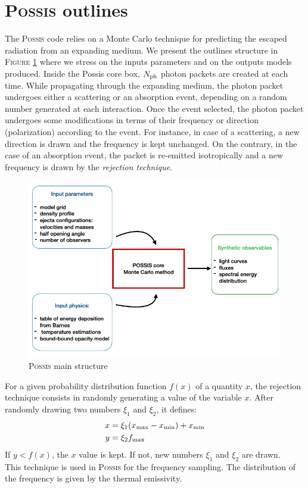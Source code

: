 \documentclass[a4paper, twoside, 11pt]{article}
\numberwithin{equation}{section}
\begin{document}
\section{P\textsc{ossis} outlines}
\label{appendix:possis}
\hspace{\parindent} The P\textsc{ossis} code relies on a Monte Carlo technique for predicting the escaped radiation from an expanding medium. We present the outlines structure in F\textsc{igure} \ref{fig:structurePossis} where we stress on the inputs parameters and on the outputs models produced. Inside the Possis core box, $N_{\rm{ph}}$  photon packets are created at each time. While propagating through the expanding medium, the photon packet undergoes either a scattering or an absorption event, depending  on a random number generated at each interaction. Once the event selected, the photon packet undergoes some modifications in terms of their frequency or direction (polarization) according to the event. For instance, in case of a scattering, a new direction is drawn and the frequency is kept unchanged. On the contrary, in the case of an absorption event, the packet is re-emitted isotropically and a new frequency is drawn by the {\itshape{rejection technique}}. \\
\begin{figure}[h!]
\includegraphics[scale=0.7]{pictures/possis_structure.png}
\caption[P\textsc{ossis} main structure]{P\textsc{ossis} main structure}
\label{fig:structurePossis}
\end{figure}

For a given probability distribution function $f(x)$ of a quantity $x$, the rejection technique consists in randomly generating a value of the variable $x$. After randomly drawing two numbers $\xi_1$ and $\xi_2$, it defines:
\begin{align*}
x &= \xi_1(x_{\rm{max}} -x_{\rm{min}} ) + x_{\rm{min}} \\
y &= \xi_2 f_{\rm{max}}
\end{align*}
If $y<f(x)$, the $x$ value is kept. If not, new numbers $\xi_1$ and $\xi_2$ are drawn.\\
This technique is used in P\textsc{ossis} for the frequency sampling. The distribution of the frequency is given by the thermal emissivity. 
\clearpage
\end{document}
